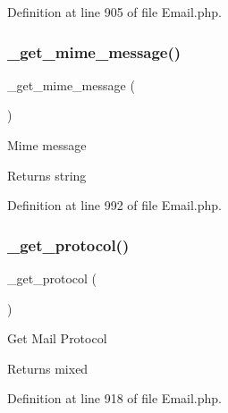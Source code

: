Definition at line 905 of file Email.\+php.

\mbox{\label{class_c_i___email_a2211ba669bd8d076041d4e72bc8a9c59}} 
\subsubsection{\texorpdfstring{\_get\_mime\_message()}{\_get\_mime\_message()}}
{\footnotesize\ttfamily \+\_\+get\+\_\+mime\+\_\+message (\begin{DoxyParamCaption}{ }\end{DoxyParamCaption})\hspace{0.3cm}{\ttfamily [protected]}}

Mime message

\begin{DoxyReturn}{Returns}
string 
\end{DoxyReturn}


Definition at line 992 of file Email.\+php.

\mbox{\label{class_c_i___email_ad0000c693b4b2768f56fcc1049f8b3c7}} 
\subsubsection{\texorpdfstring{\_get\_protocol()}{\_get\_protocol()}}
{\footnotesize\ttfamily \+\_\+get\+\_\+protocol (\begin{DoxyParamCaption}{ }\end{DoxyParamCaption})\hspace{0.3cm}{\ttfamily [protected]}}

Get Mail Protocol

\begin{DoxyReturn}{Returns}
mixed 
\end{DoxyReturn}


Definition at line 918 of file Email.\+php.

\mbox{\label{class_c_i___email_ac421324c92e681315a1f2d0d7fa96a5b}} 

